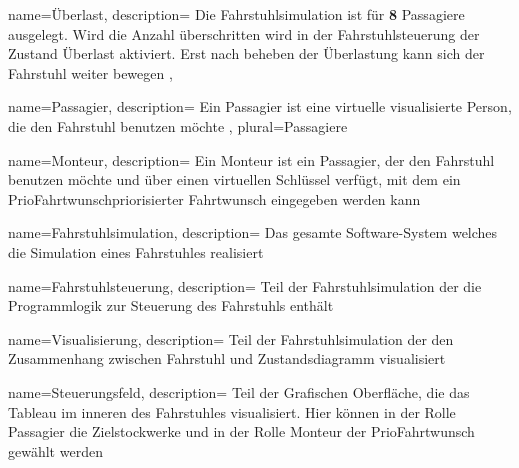 {
	name=Überlast,
	description={
		Die \gls{Fahrstuhlsimulation} ist für \textbf{8} \gls{Passagier}e ausgelegt. Wird die Anzahl überschritten wird in der \gls{Fahrstuhlsteuerung} der Zustand Überlast aktiviert. Erst nach beheben der Überlastung kann sich der Fahrstuhl weiter bewegen
	},
}

{
	name=Passagier,
	description={
		Ein Passagier ist eine virtuelle visualisierte Person, die den Fahrstuhl benutzen möchte
	},
	plural=Passagiere
}

{
	name=Monteur,
	description={
		Ein Monteur ist ein \gls{Passagier}, der den Fahrstuhl benutzen möchte und über einen virtuellen Schlüssel verfügt, mit dem ein \gls{PrioFahrtwunsch}{priorisierter Fahrtwunsch} eingegeben werden kann}
}

{
	name=Fahrstuhlsimulation,
	description={
		Das gesamte Software-System welches die Simulation eines Fahrstuhles realisiert}
}

{
	name=Fahrstuhlsteuerung,
	description={
		Teil der Fahrstuhlsimulation der die Programmlogik zur Steuerung des Fahrstuhls enthält}
}

{
	name=Visualisierung,
	description={
		Teil der Fahrstuhlsimulation der den Zusammenhang zwischen Fahrstuhl und Zustandsdiagramm visualisiert}
}

{
	name=Steuerungsfeld,
	description={
		Teil der Grafischen Oberfläche, die das Tableau im inneren des Fahrstuhles visualisiert. Hier können in der Rolle \gls{Passagier} die Zielstockwerke und in  der Rolle \gls{Monteur}  der \gls{PrioFahrtwunsch} gewählt werden}
}

